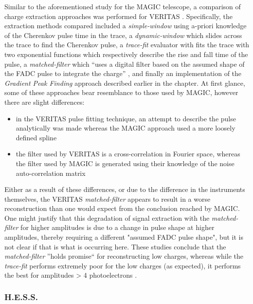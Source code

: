 Similar to the aforementioned study for the MAGIC telescope, a comparison of charge extraction approaches was performed for VERITAS \cite{Holder2005, Cogan2006, Cogan2007}. Specifically, the extraction methods compared included a \textit{simple-window} using a-priori knowledge of the Cherenkov pulse time in the trace, a \textit{dynamic-window} which slides across the trace to find the Cherenkov pulse, a \textit{trace-fit} evaluator with fits the trace with two exponential functions which respectively describe the rise and fall time of the pulse, a \textit{matched-filter} which ``uses a digital filter based on the assumed shape of the FADC pulse to integrate the charge'' \cite{Cogan2007}, and finally an implementation of the \textit{Gradient Peak Finding} approach described earlier in the chapter. At first glance, some of these approaches bear resemblance to those used by MAGIC, however there are slight differences: 
\begin{itemize}
	\item in the VERITAS pulse fitting technique, an attempt to describe the pulse analytically was made whereas the MAGIC approach used a more loosely defined spline
	\item the filter used by VERITAS is a cross-correlation in Fourier space, whereas the filter used by MAGIC is generated using their knowledge of the noise auto-correlation matrix
\end{itemize}

Either as a result of these differences, or due to the difference in the instruments themselves, the VERITAS \textit{matched-filter} appears to result in a worse reconstruction than one would expect from the conclusion reached by MAGIC. One might justify that this degradation of signal extraction with the \textit{matched-filter} for higher amplitudes is due to a change in pulse shape at higher amplitudes, thereby requiring a different "assumed FADC pulse shape", but it is not clear if that is what is occurring here. These studies conclude that the \textit{matched-filter} ''holds promise`` for reconstructing low charges, whereas while the \textit{trace-fit} performs extremely poor for the low charges (as expected), it performs the best for amplitudes > 4 photoelectrons \cite{Cogan2007}.

\subsubsection{H.E.S.S.}

